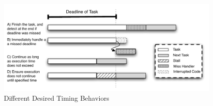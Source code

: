 \begin{figure}
  \vspace{-20pt}
  \begin{center}
    \includegraphics[scale=.7]{figs/timing_behaviors.pdf}
  \end{center}
  \vspace{-20pt}
  \caption{Different Desired Timing Behaviors}
  \label{fig:timing_behaviors}
\end{figure}

